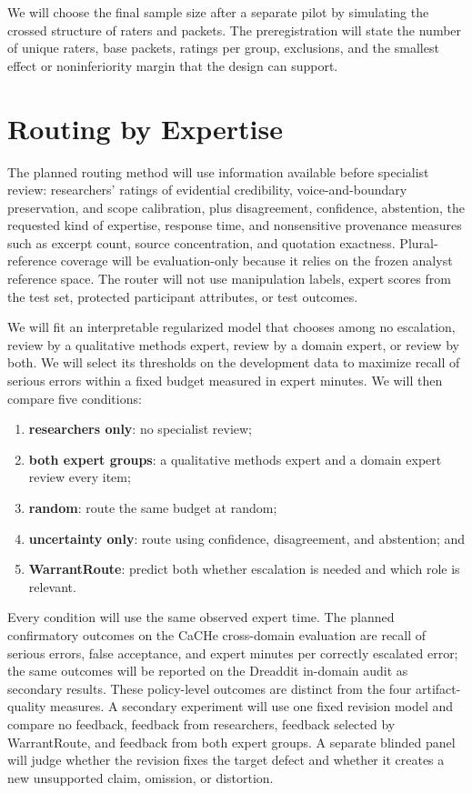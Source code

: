 We will choose the final sample size after a separate pilot by simulating the crossed structure of raters and packets. The preregistration will state the number of unique raters, base packets, ratings per group, exclusions, and the smallest effect or noninferiority margin that the design can support.

\section{Routing by Expertise}

The planned routing method will use information available before specialist review: researchers' ratings of evidential credibility, voice-and-boundary preservation, and scope calibration, plus disagreement, confidence, abstention, the requested kind of expertise, response time, and nonsensitive provenance measures such as excerpt count, source concentration, and quotation exactness. Plural-reference coverage will be evaluation-only because it relies on the frozen analyst reference space. The router will not use manipulation labels, expert scores from the test set, protected participant attributes, or test outcomes.

We will fit an interpretable regularized model that chooses among no escalation, review by a qualitative methods expert, review by a domain expert, or review by both. We will select its thresholds on the development data to maximize recall of serious errors within a fixed budget measured in expert minutes. We will then compare five conditions:

\begin{enumerate}
    \item \textbf{researchers only}: no specialist review;
    \item \textbf{both expert groups}: a qualitative methods expert and a domain expert review every item;
    \item \textbf{random}: route the same budget at random;
    \item \textbf{uncertainty only}: route using confidence, disagreement, and abstention; and
    \item \textbf{WarrantRoute}: predict both whether escalation is needed and which role is relevant.
\end{enumerate}

Every condition will use the same observed expert time. The planned confirmatory outcomes on the CaCHe cross-domain evaluation are recall of serious errors, false acceptance, and expert minutes per correctly escalated error; the same outcomes will be reported on the Dreaddit in-domain audit as secondary results. These policy-level outcomes are distinct from the four artifact-quality measures. A secondary experiment will use one fixed revision model and compare no feedback, feedback from researchers, feedback selected by WarrantRoute, and feedback from both expert groups. A separate blinded panel will judge whether the revision fixes the target defect and whether it creates a new unsupported claim, omission, or distortion.

